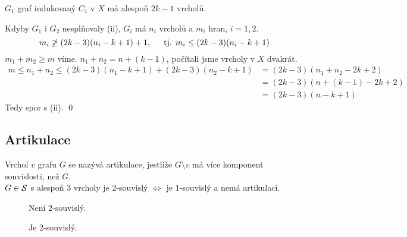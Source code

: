 $G_1$ graf indukovaný $C_1$ v $X$ má alespoň $2k-1$ vrcholů.

Kdyby $G_1$ i $G_2$ nesplňovaly (ii), $G_i$ má $n_i$ vrcholů a $m_i$ hran, $i=1,2$.
\begin{equation}
    m_i \not\geq (2k-3)(n_i-k+1)+1, \hspace{1.5em} \text{tj. } m_i \leq (2k-3)(n_i-k+1)
\end{equation}
$m_1+m_2 \geq m$ víme. $n_1+n_2 = n+(k-1)$, počítali jsme vrcholy v $X$ dvakrát.
\begin{align*}
    m \leq n_1 + n_2 \leq (2k-3)(n_1-k+1)+(2k-3)(n_2-k+1) &= (2k-3)(n_1+n_2-2k+2) \\
    &= (2k-3)(n+(k-1)-2k+2) \\
    &= (2k-3)(n-k+1)
\end{align*}
Tedy spor s (ii). 
\hspace{\fill} \qed

\newpage
\subsection{Artikulace}\label{artikulace}
Vrchol $v$ grafu $G$ se nazývá artikulace, jestliže $G \setminus v$ má více komponent souvislosti, než $G$.\\
 $G \in \S$ s alespoň 3 vrcholy je 2-souvislý $\iff$ je 1-souvislý a nemá artikulaci.
\begin{figure}[H]
    \centering
    \begin{minipage}[c]{0.3\textwidth}
        \begin{figure}[H]
        \end{figure}
        Není 2-souvislý.
    \end{minipage}%
    \hspace{0.1\textwidth}
    \begin{minipage}[c]{0.3\textwidth}
        \begin{figure}[H]
        \end{figure}
        Je 2-souvislý.
    \end{minipage}
\end{figure}

